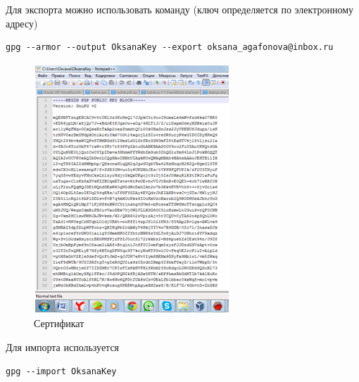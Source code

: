 \documentclass[10pt,a4paper]{article}
\begin{document}
\hspace{0,6cm}Для экспорта можно использовать команду (ключ определяется по электронному адресу)
\begin{verbatim}gpg --armor --output OksanaKey --export oksana_agafonova@inbox.ru
\end{verbatim}

\begin{figure}[h!]
\centering
\includegraphics[scale=0.8]{res/OksanaKey}
\caption{Сертификат}
\end{figure}

\hspace{0,6cm}Для импорта используется
\begin{verbatim}gpg --import OksanaKey
\end{verbatim}
\end{document}
